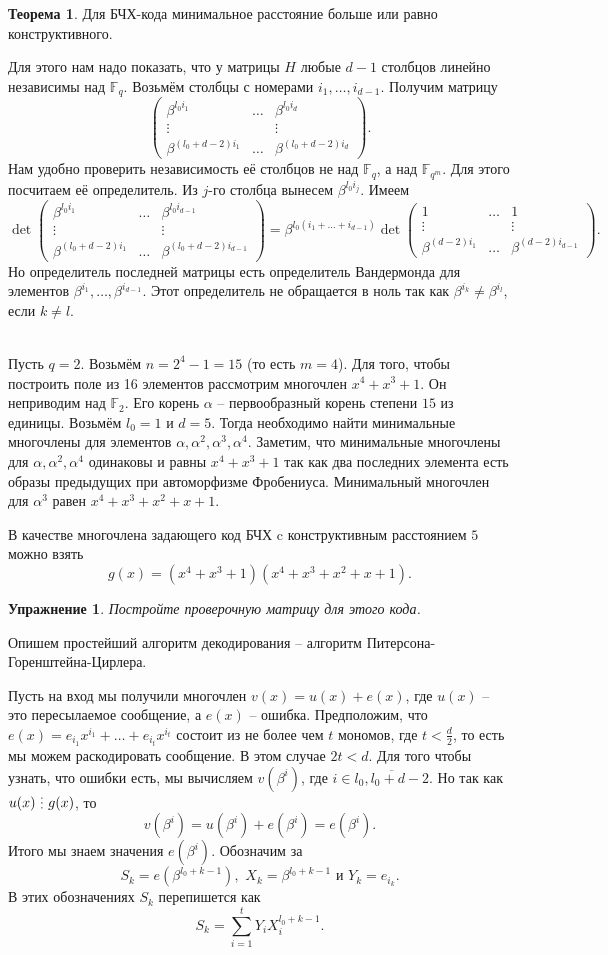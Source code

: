 \documentclass[10pt,a4paper,oneside]{book}
\newtheorem{upr}{Упражнение}
\theoremstyle{definition}
\newtheorem{thm}{{\color{red!40!black} Теорема}}
\newcommand{\mb}[1]{\mathbb{#1}}
\newcommand{\ovl}{\overline}
\newcommand{\di}{\mathop{\,\scalebox{0.85}{\raisebox{-1.2pt}[0.5\height]{\vdots}}\,}}
\def\thrm{\begin{thm}}
\def\ethrm{\end{thm}}
\def\pmat{\begin{pmatrix}}
\def\epmat{\end{pmatrix}}
\def\bupr{\begin{upr}}
\def\eupr{\end{upr}}
\begin{document}
\thrm Для БЧХ-кода минимальное расстояние больше или равно конструктивного.
\ethrm
\proof
Для этого нам надо показать, что у матрицы $H$ любые $d-1$ столбцов линейно независимы над $\mb F_q$. Возьмём столбцы с номерами $i_1,\dots,i_{d-1}$. Получим матрицу 
$$ \pmat 
\beta^{l_0 i_1}& \dots &\beta^{l_0 i_d}\\
\vdots & & \vdots\\
\beta^{(l_0+d-2)i_1} & \dots & \beta^{(l_0+d-2)i_d} 
\epmat.$$
Нам удобно проверить независимость её столбцов не над $\mb F_q$, а над $\mb F_{q^m}$. Для этого посчитаем её определитель. Из $j$-го столбца вынесем $\beta^{l_0i_j}$. Имеем
$$ \det \pmat 
\beta^{l_0 i_1}& \dots &\beta^{l_0 i_{d-1}}\\
\vdots & & \vdots\\
\beta^{(l_0+d-2)i_1} & \dots & \beta^{(l_0+d-2)i_{d-1}} 
\epmat = \beta^{l_0(i_1+\dots+i_{d-1})} \det  \pmat 
1& \dots &1\\
\vdots & & \vdots\\
\beta^{(d-2)i_1} & \dots & \beta^{(d-2)i_{d-1}} 
\epmat.$$
Но определитель последней матрицы есть определитель Вандермонда для элементов $\beta^{i_1}, \dots, \beta^{i_{d-1}}$. Этот определитель не обращается в ноль так как $\beta^{i_k}\neq \beta^{i_l}$, если $k\neq l$.


\endproof

\\
Пусть $q=2$. Возьмём $n=2^4-1=15$ (то есть $m=4$). Для того, чтобы построить поле из 16 элементов рассмотрим многочлен $x^4+x^3+1$. Он неприводим над $\mb F_2$. Его корень $\alpha$ -- первообразный корень степени $15$ из единицы. Возьмём $l_0=1$ и $d=5$. Тогда необходимо найти минимальные многочлены для элементов $\alpha,\alpha^2,\alpha^3,\alpha^4$. Заметим, что минимальные многочлены для $\alpha,\alpha^2,\alpha^4$ одинаковы и равны $x^4+x^3+1$ так как два последних элемента есть образы предыдущих при автоморфизме Фробениуса. Минимальный многочлен для $\alpha^3$ равен $x^4+x^3+x^2+x+1$. 

В качестве многочлена задающего код БЧХ c конструктивным расстоянием $5$ можно взять $$g(x)=(x^4+x^3+1)(x^4+x^3+x^2+x+1).$$

\bupr Постройте проверочную матрицу для этого кода.
\eupr

Опишем простейший алгоритм декодирования -- алгоритм Питерсона-Горенштейна-Цирлера.

Пусть на вход мы получили многочлен $v(x)=u(x)+e(x)$, где $u(x)$ -- это пересылаемое сообщение, а $e(x)$ -- ошибка. Предположим, что $e(x)=e_{i_1}x^{i_1}+\dots +e_{i_t}x^{i_t}$ состоит из не более чем $t$ мономов, где $t<\frac{d}{2}$, то есть мы можем раскодировать сообщение. В этом случае $2t<d$. Для того чтобы узнать, что ошибки есть, мы вычисляем $v(\beta^{i})$, где $i\in \ovl{l_0, l_0+d-2}$. Но так как $u(x) \di g(x)$, то
$$v(\beta^{i})=u(\beta^{i})+e(\beta^{i})=e(\beta^{i}).$$
Итого мы знаем значения $e(\beta^{i})$. Обозначим за $$S_k= e(\beta^{l_0+k-1}), \,\, X_k=\beta^{l_0+k-1} \text{ и } Y_k=e_{i_k}.$$
В этих обозначениях $S_k$ перепишется как 
$$S_k=\sum_{i=1}^t Y_i X_i^{l_0+k-1}.$$
\end{document}
